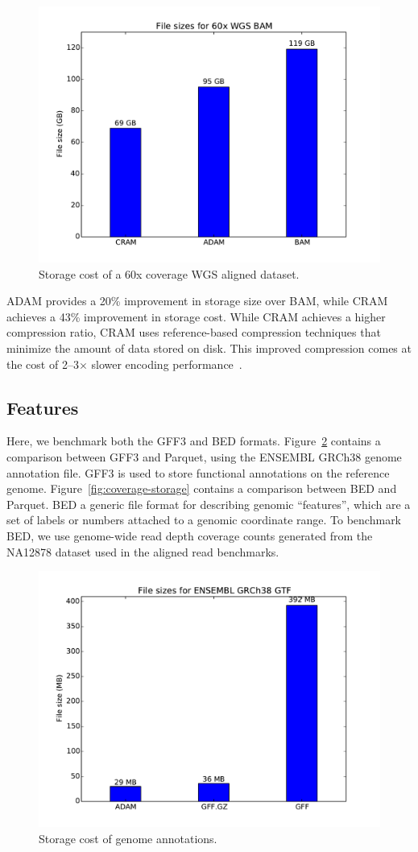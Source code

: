 \documentclass[phd]{ucbthesis}
\begin{document}
\begin{figure}[h]
  \begin{center}
    \includegraphics[width=0.5\linewidth]{graphs/bam.pdf}
  \end{center}
  \caption{Storage cost of a 60x coverage WGS aligned dataset.}
  \label{fig:read-storage}
\end{figure}

ADAM provides a 20\% improvement in storage size over BAM, while CRAM achieves
a 43\% improvement in storage cost. While CRAM achieves a higher compression
ratio, CRAM uses reference-based compression techniques that minimize the amount
of data stored on disk. This improved compression comes at the cost of
2--3$\times$ slower encoding performance~\cite{cram-benchmark}.

\subsection{Features}
\label{sec:feature-storage}

Here, we benchmark both the GFF3 and BED formats.
Figure~\ref{fig:annotation-storage} contains a comparison between GFF3 and
Parquet, using the ENSEMBL GRCh38 genome annotation file. GFF3 is used to store
functional annotations on the reference genome. Figure~\ref{fig:coverage-storage}
contains a comparison between BED and Parquet. BED a generic file format for
describing genomic ``features'', which are a set of labels or numbers attached
to a genomic coordinate range. To benchmark BED, we use genome-wide read depth
coverage counts generated from the NA12878 dataset used in the aligned read
benchmarks.

\begin{figure}[h]
  \begin{center}
    \includegraphics[width=0.5\linewidth]{graphs/gff.pdf}
  \end{center}
  \caption{Storage cost of genome annotations.}
  \label{fig:annotation-storage}
\end{figure}
\end{document}

